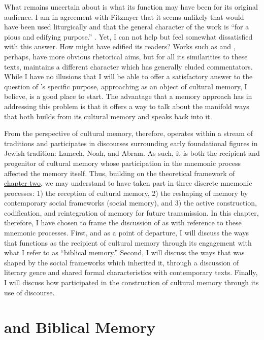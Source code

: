 What remains uncertain about \ga is what its function may have been for its original audience. I am in agreement with Fitzmyer that it seems unlikely that \ga would have been used liturgically and that the general character of the work is ``for a pious and edifying purpose.''%
    \autocite[20]{fitzmyer2004}.
Yet, I can not help but feel somewhat dissatisfied with this answer. How might \ga have edified its readers? Works such as \jub and \firstenoch, perhaps, have more obvious rhetorical aims, but for all its similarities to these texts, \ga maintains a different character which has generally eluded commentators. While I have no illusions that I will be able to offer a satisfactory answer to the question of \ga's specific purpose, approaching \ga as an object of cultural memory, I believe, is a good place to start. The advantage that a memory approach has in addressing this problem is that it offers a way to talk about the manifold ways that \ga both builds from its cultural memory and speaks back into it.

From the perspective of cultural memory, therefore, \ga operates within a stream of traditions and participates in discourses surrounding early foundational figures in Jewish tradition: Lamech, Noah, and Abram. As such, it is both the recipient and progenitor of cultural memory whose participation in the mnemonic process affected the memory itself. Thus, building on the theoretical framework of \hyperref[chap:memory]{chapter two}, we may understand \ga to have taken part in three discrete mnemonic processes: 1) the reception of cultural memory, 2) the reshaping of memory by contemporary social frameworks (social memory), and 3) the active construction, codification, and reintegration of memory for future transmission. In this chapter, therefore, I have chosen to frame the discussion of \ga as \rwb with reference to these mnemonic processes. First, and as a point of departure, I will discuss the ways that \ga functions as the recipient of cultural memory through its engagement with what I refer to as  ``biblical memory.'' Second, I will discuss the ways that \ga was shaped by the social frameworks which inherited it, through a discussion of literary genre and shared formal characteristics with contemporary texts. Finally, I will discuss how \ga participated in the construction of cultural memory through its use of \psgraphical discourse.


\section{\ga and Biblical Memory}

